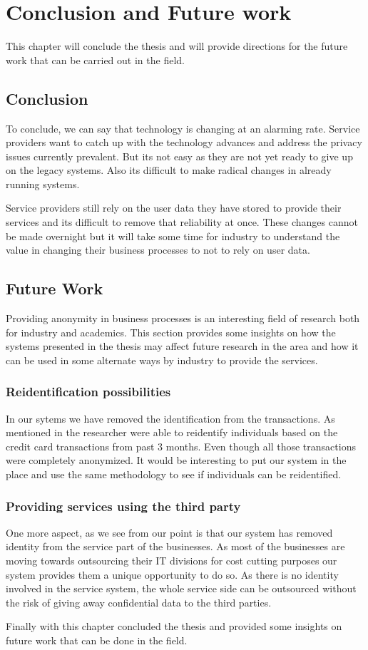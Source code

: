 \chapter{Conclusion and Future work}
This chapter will conclude the thesis and will provide directions for the future work that can be carried out in the field.
\section{Conclusion}
To conclude, we can say that technology is changing at an alarming rate. Service providers want to catch up with the technology advances and address the privacy issues currently prevalent. But its not easy as they are not yet ready to give up on the legacy systems. Also its difficult to make radical changes in already running systems. 

Service providers still rely on the user data they have stored to provide their services and its difficult to remove that reliability at once. These changes cannot be made overnight but it will take some time for industry to understand the value in changing their business processes to not to rely on user data. 
\section{Future Work}
Providing anonymity in business processes is an interesting field of research both for industry and academics. This section provides some insights on how the systems presented in the thesis may affect future research in the area and how it can be used in some alternate ways by industry to provide the services.
\subsection{Reidentification possibilities}
In our sytems we have removed the identification from the transactions. As mentioned in \cite{de2015unique} the researcher were able to reidentify individuals based on the credit card transactions from past 3 months. Even though all those transactions were completely anonymized. It would be interesting to put our system in the place and use the same methodology to see if individuals can be reidentified.
\subsection{Providing services using the third party}
One more aspect, as we see from our point is that our system has removed identity from the service part of the businesses. As most of the businesses are moving towards outsourcing their IT divisions for cost cutting purposes our system provides them a unique opportunity to do so. As there is no identity involved in the service system, the whole service side can be outsourced without the risk of giving away confidential data to the third parties.

Finally with this chapter concluded the thesis and provided some insights on future work that can be done in the field.

